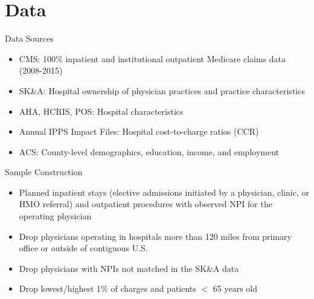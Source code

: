 \documentclass[t,aspectratio=169]{beamer}
\begin{document}
\section{Data}
\begin{frame}{Data Sources}
    \begin{itemize}
        \item CMS: 100\% inpatient and institutional outpatient Medicare claims data (2008-2015)
        \item SK\&A: Hospital ownership of physician practices and practice characteristics
        \item AHA, HCRIS, POS: Hospital characteristics
        \item Annual IPPS Impact Files: Hospital cost-to-charge ratios (CCR)
        \item ACS: County-level demographics, education, income, and employment
    \end{itemize}
\end{frame}

\begin{frame}{Sample Construction}
    \begin{itemize}
        \item<1-> Planned inpatient stays (elective admissions initiated by a physician, clinic, or HMO referral) and outpatient procedures with observed NPI for the operating physician
        \item<2-> Drop physicians operating in hospitals more than 120 miles from primary office or outside of contiguous U.S.
        \item<3-> Drop physicians with NPIs not matched in the SK\&A data
        \item<4-> Drop lowest/highest 1\% of charges and patients $<$ 65 years old
    \end{itemize}
\end{frame}
\end{document}
